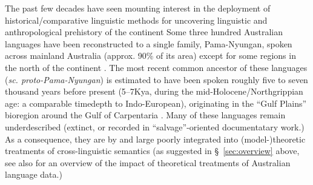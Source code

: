 \documentclass[12pt,dvipsnames]{report}
\begin{document}
The past few decades have seen mounting interest in the deployment of historical\slash{}comparative linguistic methods for uncovering linguistic and anthropological prehistory of the continent \citetext{\citealp[see][]{McConvell2011} for an overview.} Some three hundred Australian languages have been reconstructed to a single family, Pama-Nyungan, spoken across mainland Australia (approx. 90\% of its area) except for some regions in the north of the continent \citep{Dixon1980,Bowern2021}. The most recent common ancestor of these languages (\textit{sc. proto-Pama-Nyungan}) is estimated to have been spoken roughly five to seven thousand years before present (5--7Kya, during the mid-Holocene/Northgrippian age: a comparable timedepth to Indo-European), originating in the ``Gulf Plains'' bioregion around the Gulf of Carpentaria \citetext{\citealp{Bouckaert2018}, supporting earlier work, incl. \citealp{Hale1964} a.o.}. Many of these languages remain underdescribed (extinct, or recorded in ``salvage''-oriented documentatary work.) As a consequence, they are by and large poorly integrated into (model-)theoretic treatments of cross-linguistic semantics (as suggested in \S~\ref{sec:overview} above, see also \citealp{Nordlinger2021} for an overview of the impact of theoretical treatments of Australian language data.)
\end{document}
